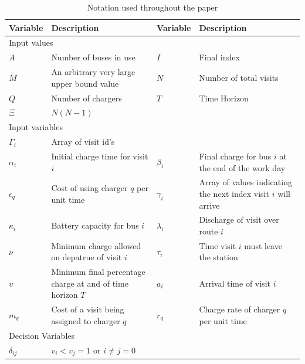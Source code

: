 \documentclass[letterpaper, 10pt, conference]{IEEEtran}
\begin{document}
\begin{table}[!t]
	\caption{Notation used throughout the paper}
	\label{tab:variables}
	\centering
	\begin{tabular}{l l l l}
		\toprule
		\textbf{Variable} & \textbf{Description} & \textbf{Variable} & \textbf{Description} \\
		\toprule
		\multicolumn{4}{l}{Input values} \\
			$A$         & Number of buses in use &
			$I$         & Final index            \\
			$M$         & An arbitrary very large upper bound value &
			$N$         & Number of total visits                    \\
			$Q$         & Number of chargers                        &
			$T$         & Time Horizon           \\
			$\Xi$       & $N(N-1)$                                   \\
		\hline
		\multicolumn{4}{l}{Input variables} \\
			$\Gamma_i$   & Array of visit id's                                             \\
			$\alpha_i$   & Initial charge time for visit  $i$                              &
			$\beta_{i}$  & Final charge for bus $i$ at the end of the work day             \\
			$\epsilon_q$ & Cost of using charger $q$ per unit time                         &
			$\gamma_i$   & Array of values indicating the next index visit $i$ will arrive \\
			$\kappa_i$   & Battery capacity for bus \(i\)                                  &
			$\lambda_i$  & Discharge of visit over route  $i$                              \\
			$\nu$        & Minimum charge allowed on depatrue of visit \(i\)               &
			$\tau_i$     & Time visit $i$ must leave the station                           \\
			$\upsilon$   & Minimum final percentage charge at and of time horizon \(T\)    &
			$a_i$        & Arrival time of visit  $i$                                      \\
			$m_q$        & Cost of a visit being assigned to charger  $q$                  &
			$r_q$        & Charge rate of charger $q$ per unit time                        \\
		\hline
		\multicolumn{4}{l}{Decision Variables} \\
			$\delta_{ij}$ & $v_i < v_j = 1$ \textrm{ or } $i \neq j = 0$              &

\end{tabular}
\end{table}
\end{document}
